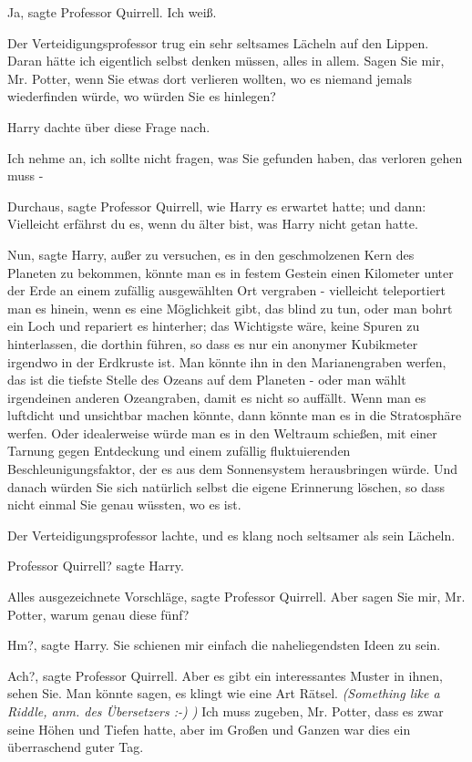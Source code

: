 \glqq{}Ja\grqq{}, sagte Professor Quirrell. \glqq{}Ich weiß.\grqq{}

Der Verteidigungsprofessor trug ein sehr seltsames Lächeln auf den Lippen. \glqq{}
Daran hätte ich eigentlich selbst denken müssen, alles in allem. Sagen Sie mir,
Mr. Potter, wenn Sie etwas dort verlieren wollten, wo es niemand jemals
wiederfinden würde, wo würden Sie es hinlegen?\grqq{}

Harry dachte über diese Frage nach.

\glqq{}Ich nehme an, ich sollte nicht fragen, was Sie gefunden haben, das
verloren gehen muss -\grqq{}

\glqq{}Durchaus\grqq{}, sagte Professor Quirrell, wie Harry es erwartet hatte;
und dann: \glqq{}Vielleicht erfährst du es, wenn du älter bist\grqq{}, was Harry
nicht getan hatte.

\glqq{}Nun\grqq{}, sagte Harry, \glqq{}außer zu versuchen, es in den geschmolzenen
Kern des Planeten zu bekommen, könnte man es in festem Gestein einen Kilometer
unter der Erde an einem zufällig ausgewählten Ort vergraben - vielleicht
teleportiert man es hinein, wenn es eine Möglichkeit gibt, das blind zu tun,
oder man bohrt ein Loch und repariert es hinterher; das Wichtigste wäre, keine
Spuren zu hinterlassen, die dorthin führen, so dass es nur ein anonymer
Kubikmeter irgendwo in der Erdkruste ist. Man könnte ihn in den Marianengraben
werfen, das ist die tiefste Stelle des Ozeans auf dem Planeten - oder man wählt
irgendeinen anderen Ozeangraben, damit es nicht so auffällt. Wenn man es
luftdicht und unsichtbar machen könnte, dann könnte man es in die Stratosphäre
werfen. Oder idealerweise würde man es in den Weltraum schießen, mit einer
Tarnung gegen Entdeckung und einem zufällig fluktuierenden
Beschleunigungsfaktor, der es aus dem Sonnensystem herausbringen würde. Und
danach würden Sie sich natürlich selbst die eigene Erinnerung löschen, so dass
nicht einmal Sie genau wüssten, wo es ist.\grqq{}

Der Verteidigungsprofessor lachte, und es klang noch seltsamer als sein Lächeln.

\glqq{}Professor Quirrell?\grqq{} sagte Harry.

\glqq{}Alles ausgezeichnete Vorschläge\grqq{}, sagte Professor Quirrell. \glqq{}
Aber sagen Sie mir, Mr. Potter, warum genau diese fünf?\grqq{}

\glqq{}Hm?\grqq{}, sagte Harry. \glqq{}Sie schienen mir einfach die
naheliegendsten Ideen zu sein.\grqq{}

\glqq{}Ach?\grqq{}, sagte Professor Quirrell. \glqq{}Aber es gibt ein
interessantes Muster in ihnen, sehen Sie. Man könnte sagen, es klingt wie eine
Art Rätsel. \emph{(\glqq{}Something like a Riddle\grqq{}, anm. des Übersetzers
:-) )} Ich muss zugeben, Mr. Potter, dass es zwar seine Höhen und Tiefen hatte,
aber im Großen und Ganzen war dies ein überraschend guter Tag.\grqq{}

